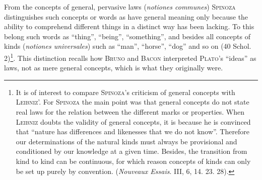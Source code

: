 \documentclass[12pt]{article}
\begin{document}
From the concepts of general, pervasive laws (\textit{notiones communes}) \textsc{Spinoza}
distinguishes such concepts or words as have general meaning only because the ability to
comprehend different things in a distinct way has been lacking. To this belong such words as
``thing'', ``being'', ``something'', and besides all concepts of kinds (\textit{notiones
universales}) such as ``man'', ``horse'', ``dog'' and so on (40 Schol. 2)\footnote{It is of
interest to compare \textsc{Spinoza}'s criticism of general concepts with \textsc{Leibniz}'.
For \textsc{Spinoza} the main point was that general concepts do not state real laws for the
relation between the different marks or properties. When \textsc{Leibniz} doubts the
validity of general concepts, it is because he is convinced that ``nature has differences and
likenesses that we do not know''. Therefore our determinations of the natural kinds must
always be provisional and conditioned by our knowledge at a given time. Besides, the
transition from kind to kind can be continuous, for which reason concepts of kinds can only be
set up purely by convention. (\textit{Nouveaux Essais}. III, 6, 14. 23. 28).}. This
distinction recalls how \textsc{Bruno} and \textsc{Bacon} interpreted \textsc{Plato}'s
``ideas'' as laws, not as mere general concepts, which is what they originally were.
\end{document}
